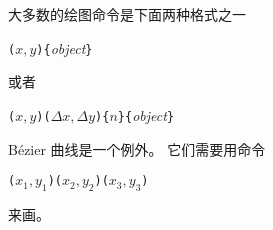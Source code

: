 大多数的绘图命令是下面两种格式之一
\begin{lscommand}
\verb|(|$x,y$\verb|){|\emph{object}\verb|}|
\end{lscommand}
\noindent 或者
\begin{lscommand}
\verb|(|$x,y$\verb|)(|$\Delta x,\Delta
y$\verb|){|$n$\verb|}{|\emph{object}\verb|}|\end{lscommand}
B\'ezier 曲线是一个例外。 它们需要用命令
\begin{lscommand}
\verb|(|$x_1,y_1$\verb|)(|$x_2,y_2$\verb|)(|$x_3,y_3$\verb|)|
\end{lscommand}
\noindent 来画。
\newpage

